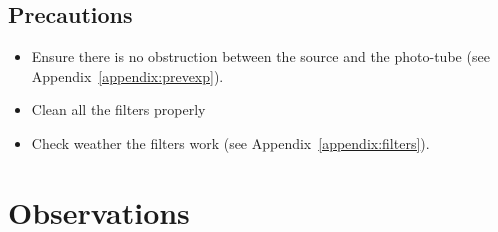 \documentclass[%
 sor,
 jor,
 amsmath,amssymb,
 reprint,%
]{revtex4-2}
\begin{document}
\subsection{Precautions}
\begin{itemize}
  \item Ensure there is no obstruction between the source and the photo-tube (see Appendix~\ref{appendix:prevexp}).
  \item Clean all the filters properly
   \item Check weather the filters work   (see Appendix~\ref{appendix:filters}).
\end{itemize}




\section{Observations}
\end{document}
